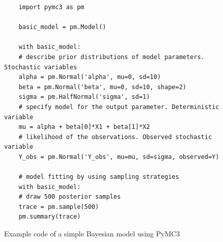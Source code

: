 \documentclass{article}
\begin{document}
\begin{figure}
	\begin{lstlisting}
	import pymc3 as pm
	
	basic_model = pm.Model()
	
	with basic_model:
	# describe prior distributions of model parameters. Stochastic variables
	alpha = pm.Normal('alpha', mu=0, sd=10)
	beta = pm.Normal('beta', mu=0, sd=10, shape=2)
	sigma = pm.HalfNormal('sigma', sd=1)
	# specify model for the output parameter. Deterministic variable
	mu = alpha + beta[0]*X1 + beta[1]*X2
	# likelihood of the observations. Observed stochastic variable
	Y_obs = pm.Normal('Y_obs', mu=mu, sd=sigma, observed=Y)
	
	# model fitting by using sampling strategies   
	with basic_model:
	# draw 500 posterior samples
	trace = pm.sample(500)
	pm.summary(trace)
	\end{lstlisting}
	\caption[Example code of a simple Bayesian model using PyMC3]{Example code of a simple Bayesian model using PyMC3}
	\label{fig:pymc3_example_code}
\end{figure}





\end{document}
